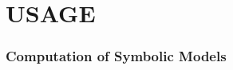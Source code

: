 \documentclass[a4paper]{amsart}
\newcommand{\intcc}[1]{\ensuremath{{\left[#1\right]}}}
\newcommand{\intco}[1]{\ensuremath{{\left[#1\right[}}}
\newcommand{\N}{\mathbb{N}}
\newcommand{\pre}{{\mathrm{pre}}}
\begin{document}
%
%




\newpage


\part{USAGE}

\section{Computation of Symbolic Models}
\label{s:usage:abs}
\end{document}
